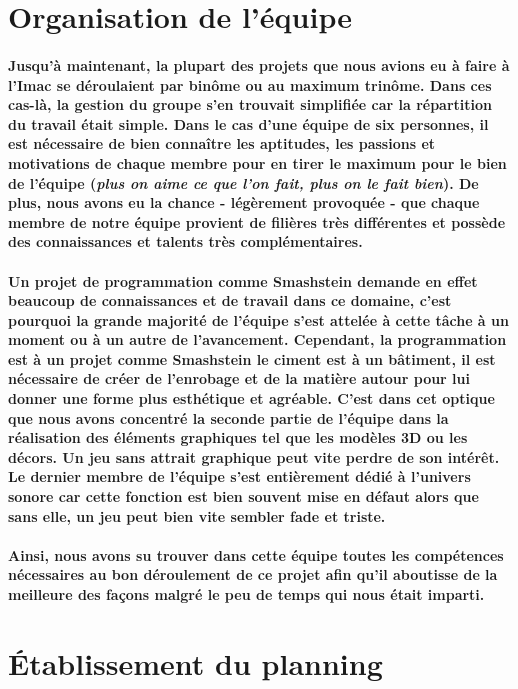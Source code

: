 \section{Organisation de l'équipe}
\paragraph{Jusqu'à maintenant, la plupart des projets que nous avions eu à faire à l'Imac se déroulaient par binôme ou au maximum trinôme. Dans ces cas-là, la gestion du groupe s'en trouvait simplifiée car la répartition du travail était simple. Dans le cas d'une équipe de six personnes, il est nécessaire de bien connaître les aptitudes, les passions et motivations de chaque membre pour en tirer le maximum pour le bien de l'équipe (\textit{plus on aime ce que l'on fait, plus on le fait bien}). De plus, nous avons eu la chance - légèrement provoquée - que chaque membre de notre équipe provient de filières très différentes et possède des connaissances et talents très complémentaires.}

\paragraph{Un projet de programmation comme Smashstein demande en effet beaucoup de connaissances et de travail dans ce domaine, c'est pourquoi la grande majorité de l'équipe s'est attelée à cette tâche à un moment ou à un autre de l'avancement. Cependant, la programmation est à un projet comme Smashstein le ciment est à un bâtiment, il est nécessaire de créer de l'enrobage et de la matière autour pour lui donner une forme plus esthétique et agréable. C'est dans cet optique que nous avons concentré la seconde partie de l'équipe dans la réalisation des éléments graphiques tel que les modèles 3D ou les décors. Un jeu sans attrait graphique peut vite perdre de son intérêt. Le dernier membre de l'équipe s'est entièrement dédié à l'univers sonore car cette fonction est bien souvent mise en défaut alors que sans elle, un jeu peut bien vite sembler fade et triste.}

\paragraph{Ainsi, nous avons su trouver dans cette équipe toutes les compétences nécessaires au bon déroulement de ce projet afin qu'il aboutisse de la meilleure des façons malgré le peu de temps qui nous était imparti.}

\newpage
\section{\'Etablissement du planning}


